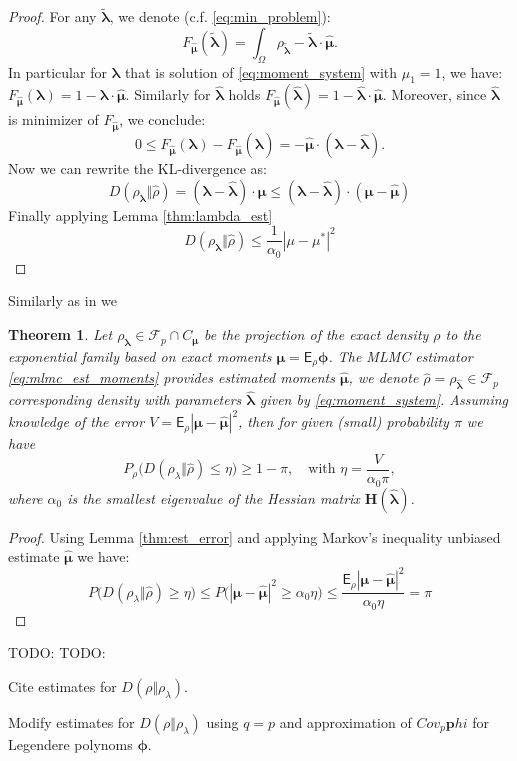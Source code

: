 \documentclass{article}
\newtheorem{theorem}{Theorem}[section]
\def\vc#1{\mathbf{\boldsymbol{#1}}}     %
\def\tn#1{\boldsymbol{#1}}
\def \E{{\mathsf E}}
\def\todo#1{{\color{red}TODO: #1}}
\def\abs#1{|#1|}
\def\tvl{\vc{\tilde\lambda}}
\def\vl{{\vc\lambda}}
\def\estvl{{\vc{\hat\lambda}}}
\def\estrho{\hat\rho}
\def\vmu{\vc\mu}
\def\estvmu{{\vc{\hat\mu}}}
\def\vphi{\vc\phi}
\begin{document}
\begin{proof}
For any $\tvl$, we denote (c.f. \eqref{eq:min_problem}):
\[
F_{\estvmu}(\tvl) = \int_{\Omega} \rho_{\tvl} - \tvl\cdot\estvmu.
\]
In particular for $\vl$ that is solution of \eqref{eq:moment_system} with $\mu_1 = 1$, we have:
$F_{\estvmu}(\vl) = 1 - \vl\cdot\estvmu$. Similarly for $\estvl$ holds
$F_{\estvmu}(\estvl) = 1 - \estvl\cdot\estvmu$. Moreover, since $\estvl$ is minimizer 
of $F_{\estvmu}$, we conclude:
\[
 0\le F_{\estvmu}(\vl) - F_{\estvmu}(\estvl) = - \estvmu\cdot(\vl - \estvl).
\]
Now we can rewrite the KL-divergence as:
\[
  D(\rho_{\vl}\Vert \estrho) = (\vl - \estvl)\cdot \vmu \le
  (\vl - \estvl)\cdot (\vmu - \estvmu)
\]
Finally applying Lemma \ref{thm:lambda_est}
\[
D(\rho_{\vl}\Vert \estrho) \le \frac{1}{\alpha_0} \abs{\mu - \mu^*}^2
\]
 
\end{proof}
Similarly as in \cite[Theorem 3]{Barron1991} we  
\begin{theorem}
  \label{eq:estimate_err_var}
  Let $\rho_{\vl} \in \mathcal F_p \cap C_{\vmu}$ be the projection of the exact density $\rho$ to the exponential family based on exact moments  $\vmu = \E_\rho \vphi$. The MLMC estimator \eqref{eq:mlmc_est_moments} provides estimated moments $\estvmu$, we denote $\estrho = \rho_{\estvl}\in \mathcal F_p$ corresponding density with parameters $\estvl$ given by \eqref{eq:moment_system}.
  Assuming knowledge of the error $V = \E_{\rho} |\vmu - \estvmu|^2$, then for given (small) probability $\pi$
  we have
  \[
      P_{\rho}\Big( D(\rho_{\lambda}\Vert \estrho) \le \eta\Big) \ge 1 - \pi,\quad 
      \text{with } \eta = \frac{V}{\alpha_0 \pi},
  \]
  where $\alpha_0$ is the smallest eigenvalue of the Hessian matrix $\tn H(\estvl)$.
  
\end{theorem}
\begin{proof}
  Using Lemma \ref{thm:est_error} and applying Markov's inequality unbiased estimate $\estvmu$ we have:
  \[
   P\Big( D(\rho_{\lambda}\Vert \estrho) \ge \eta\Big) 
   \le P\Big( \abs{\vmu - \estvmu}^2 \ge \alpha_0  \eta\Big)
   \le \frac{\E_{\rho} |\vmu - \estvmu|^2}{\alpha_0 \eta} = \pi
  \]
\end{proof}


\todo{TODO:}

Cite estimates for $D(\rho\Vert\rho_{\lambda})$.

Modify estimates for $D(\rho\Vert\rho_{\lambda})$ using $q=p$ and
approximation of $Cov_p \vc phi$ for Legendere polynoms $\vc\phi$.
\end{document}

